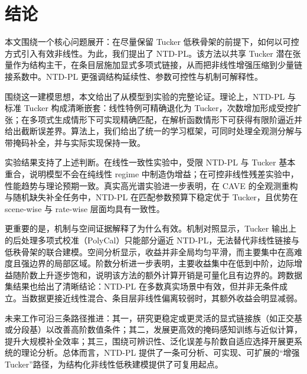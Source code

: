 \section{结论}

本文围绕一个核心问题展开：在尽量保留 Tucker 低秩骨架的前提下，如何以可控方式引入有效非线性。为此，我们提出了 NTD-PL。该方法以共享 Tucker 潜在张量作为结构主干，在条目层施加显式多项式链接，从而把非线性增强压缩到少量链接系数中。NTD-PL 更强调结构延续性、参数可控性与机制可解释性。

围绕这一建模思想，本文给出了从模型到实验的完整论证。理论上，NTD-PL 与标准 Tucker 构成清晰嵌套：线性特例可精确退化为 Tucker，次数增加形成受控扩张；在多项式生成情形下可实现精确匹配，在解析函数情形下可获得有限阶逼近并给出截断误差界。算法上，我们给出了统一的学习框架，可同时处理全观测分解与带掩码补全，并与实际实现保持一致。

实验结果支持了上述判断。在线性一致性实验中，受限 NTD-PL 与 Tucker 基本重合，说明模型不会在纯线性 regime 中制造伪增益；在可控非线性残差实验中，性能趋势与理论预期一致。真实高光谱实验进一步表明，在 CAVE 的全观测重构与随机缺失补全任务中，NTD-PL 在匹配参数预算下稳定优于 Tucker，且优势在 scene-wise 与 rate-wise 层面均具有一致性。

更重要的是，机制与空间证据解释了为什么有效。机制对照显示，Tucker 输出上的后处理多项式校准（PolyCal）只能部分逼近 NTD-PL，无法替代非线性链接与低秩骨架的联合建模。空间分析显示，收益并非全局均匀平滑，而主要集中在高难度且强边界的局部区域。阶数分析进一步表明，主要收益集中在低到中阶，边际增益随阶数上升逐步饱和，说明该方法的额外计算开销是可量化且有边界的。跨数据集结果也给出了清晰结论：NTD-PL 在多数真实场景中有效，但并非无条件成立。当数据更接近线性混合、条目层非线性偏离较弱时，其额外收益会明显减弱。

未来工作可沿三条路径推进：其一，研究更稳定或更灵活的显式链接族（如正交基或分段基）以改善高阶数值条件；其二，发展更高效的掩码感知训练与近似计算，提升大规模补全效率；其三，围绕可辨识性、泛化误差与阶数自适应选择开展更系统的理论分析。总体而言，NTD-PL 提供了一条可分析、可实现、可扩展的“增强 Tucker”路径，为结构化非线性低秩建模提供了可复用起点。
